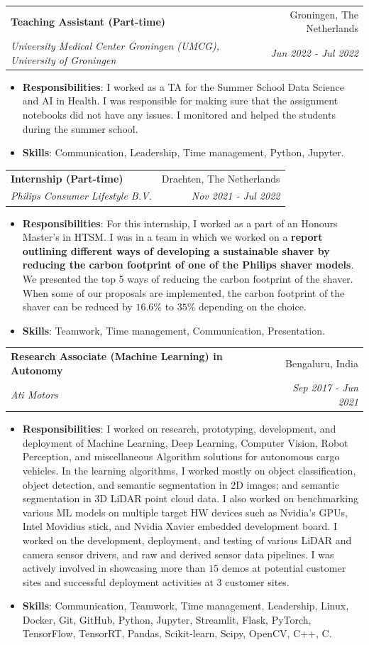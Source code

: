 \documentclass[letterpaper, 10pt]{article}
\makeatletter
\newcommand{\resumeItem}[2]{
    \item\small{
        \textbf{#1}{: #2 \vspace{-2pt}}
    }
}
\newcommand{\resumeSubheading}[4]{
    \vspace{-1pt}\item
    \begin{tabular*}{0.97\textwidth}{l@{\extracolsep{\fill}}r}
        \textbf{#1} & #2 \\
        \textit{\small#3} & \textit{\small #4} \\
    \end{tabular*}\vspace{-5pt}
}
\newcommand{\resumeSubHeadingListStart}{\begin{itemize}[leftmargin=*]}
\newcommand{\resumeSubHeadingListEnd}{\end{itemize}}
\makeatother
\begin{document}
        \resumeSubheading{Teaching Assistant (Part-time)}{Groningen, The Netherlands}{University Medical Center Groningen (UMCG), University of Groningen}{Jun 2022 - Jul 2022}
            \resumeSubHeadingListStart
                \resumeItem{Responsibilities}{I worked as a TA for the Summer School Data Science and AI in Health. I was responsible for making sure that the assignment notebooks did not have any issues. I monitored and helped the students during the summer school.}
                \resumeItem{Skills}{Communication, Leadership, Time management, Python, Jupyter.}
            \resumeSubHeadingListEnd

        \resumeSubheading{Internship (Part-time)}{Drachten, The Netherlands}{Philips Consumer Lifestyle B.V.}{Nov 2021 - Jul 2022}
            \resumeSubHeadingListStart
                \resumeItem{Responsibilities}{For this internship, I worked as a part of an Honours Master's in HTSM. I was in a team in which we worked on a \textbf{report outlining different ways of developing a sustainable shaver by reducing the carbon footprint of one of the Philips shaver models}. We presented the top 5 ways of reducing the carbon footprint of the shaver. When some of our proposals are implemented, the carbon footprint of the shaver can be reduced by $16.6\%$ to $35\%$ depending on the choice.}
                \resumeItem{Skills}{Teamwork, Time management, Communication, Presentation.}
            \resumeSubHeadingListEnd

        \resumeSubheading{Research Associate (Machine Learning) in Autonomy}{Bengaluru, India}{Ati Motors}{Sep 2017 - Jun 2021}
            \resumeSubHeadingListStart
                \resumeItem{Responsibilities}{I worked on research, prototyping, development, and deployment of Machine Learning, Deep Learning, Computer Vision, Robot Perception, and miscellaneous Algorithm solutions for autonomous cargo vehicles. In the learning algorithms, I worked mostly on object classification, object detection, and semantic segmentation in 2D images; and semantic segmentation in 3D LiDAR point cloud data. I also worked on benchmarking various ML models on multiple target HW devices such as Nvidia's GPUs, Intel Movidius stick, and Nvidia Xavier embedded development board. I worked on the development, deployment, and testing of various LiDAR and camera sensor drivers, and raw and derived sensor data pipelines. I was actively involved in showcasing more than $15$ demos at potential customer sites and successful deployment activities at $3$ customer sites.}
                \resumeItem{Skills}{Communication, Teamwork, Time management, Leadership, Linux, Docker, Git, GitHub, Python, Jupyter, Streamlit, Flask, PyTorch, TensorFlow, TensorRT, Pandas, Scikit-learn, Scipy, OpenCV, C++, C.}
            \resumeSubHeadingListEnd
\end{document}
